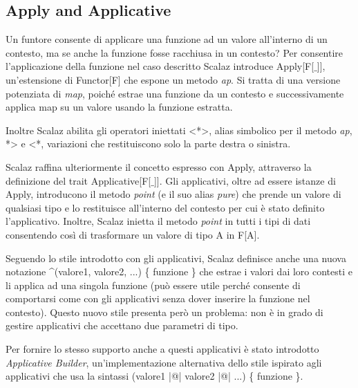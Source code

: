 \subsection{Apply and Applicative}

Un funtore consente di applicare una funzione ad un valore all'interno di un contesto, ma se anche la funzione fosse racchiusa in un contesto? Per consentire l'applicazione della funzione nel caso descritto Scalaz introduce Apply[F[$\_$]], un'estensione di Functor[F] che espone un metodo \textit{ap}. Si tratta di una versione potenziata di \textit{map}, poiché estrae una funzione da un contesto e successivamente applica map su un valore usando la funzione estratta. 

Inoltre Scalaz abilita gli operatori iniettati <*>, alias simbolico per il metodo \textit{ap}, *> e <*, variazioni che restituiscono solo la parte destra o sinistra.

Scalaz raffina ulteriormente il concetto espresso con Apply, attraverso la definizione del trait Applicative[F[$\_$]]. Gli applicativi, oltre ad essere istanze di Apply, introducono il metodo \textit{point} (e il suo alias \textit{pure}) che prende un valore di qualsiasi tipo e lo restituisce all'interno del contesto per cui è stato definito l'applicativo. Inoltre, Scalaz inietta il metodo \textit{point} in tutti i tipi di dati consentendo così di trasformare un valore di tipo A in F[A].



Seguendo lo stile introdotto con gli applicativi, Scalaz definisce anche una nuova notazione \textasciicircum(valore1, valore2, ...) \{ funzione \} che estrae i valori dai loro contesti e li applica ad una singola funzione (può essere utile perché consente di comportarsi come con gli applicativi senza dover inserire la funzione nel contesto). Questo nuovo stile presenta però un problema: non è in grado di gestire applicativi che accettano due parametri di tipo.

Per fornire lo stesso supporto anche a questi applicativi è stato introdotto \textit{Applicative Builder}, un'implementazione alternativa dello stile ispirato agli applicativi che usa la sintassi (valore1 |@| valore2 |@| ...) \{ funzione \}.



